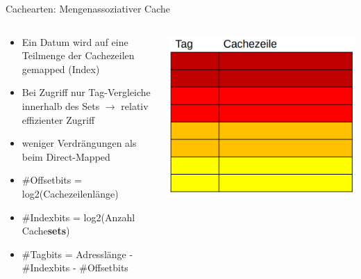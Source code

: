 \documentclass[
  german,            %
  aspectratio=169,    %
]{tumbeamer}
\begin{document}
\begin{frame}[c]{Cachearten: Mengenassoziativer Cache}{}
	\begin{columns}[c]
	  \begin{column}{0.5\textwidth}
		\begin{itemize}
		  \item Ein Datum wird auf eine Teilmenge der Cachezeilen gemapped (Index) 
		  \item Bei Zugriff nur Tag-Vergleiche innerhalb des Sets $\rightarrow$ relativ effizienter Zugriff 
		  \item weniger Verdrängungen als beim Direct-Mapped
		  \item \#Offsetbits = log2(Cachezeilenlänge)
		  \item \#Indexbits = log2(Anzahl Cache\textbf{sets})
		  \item \#Tagbits = Adresslänge - \#Indexbits - \#Offsetbits
		\end{itemize}
	  \end{column}
	  \begin{column}{0.5\textwidth}
		\includegraphics[width=\linewidth]{w05_mengenassoz_rep.png}
	  \end{column}
	\end{columns}
\end{frame}
\end{document}
